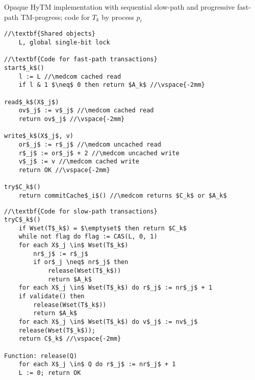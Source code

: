 \begin{algorithm*}[!ht]
\caption{Opaque HyTM implementation with sequential slow-path and progressive fast-path TM-progress; code for $T_k$ by process $p_i$}
\label{alg:inswrite2}
\vspace{-2mm}
\noindent\lstset{style=customc}
\begin{minipage}{0.49\textwidth}
\begin{lstlisting}[frame=none,firstnumber=1,mathescape=true]
//\textbf{Shared objects}
    L, global single-bit lock

//\textbf{Code for fast-path transactions}
start$_k$()
    l := L //\medcom cached read
    if l & 1 $\neq$ 0 then return $A_k$ //\vspace{-2mm}

read$_k$(X$_j$)
    ov$_j$ := v$_j$ //\medcom cached read
    return ov$_j$ //\vspace{-2mm}

write$_k$(X$_j$, v)
    or$_j$ := r$_j$ //\medcom uncached read
    r$_j$ := or$_j$ + 2 //\medcom uncached write
    v$_j$ := v //\medcom cached write
    return OK //\vspace{-2mm}

try$C_k$()
    return commitCache$_i$() //\medcom returns $C_k$ or $A_k$
\end{lstlisting}
\end{minipage}
\begin{minipage}{0.49\textwidth}
\begin{lstlisting}[frame=none,firstnumber=last,mathescape=true]
//\textbf{Code for slow-path transactions}
tryC$_k$()
    if Wset(T$_k$) = $\emptyset$ then return $C_k$
    while not flag do flag := CAS(L, 0, 1)
    for each X$_j \in$ Wset(T$_k$)
        nr$_j$ := r$_j$
        if or$_j \neq$ nr$_j$ then
            release(Wset(T$_k$))
            return $A_k$
    for each X$_j \in$ Wset(T$_k$) do r$_j$ := nr$_j$ + 1
    if validate() then
        release(Wset(T$_k$))
        return $A_k$
    for each X$_j \in$ Wset(T$_k$) do v$_j$ := nv$_j$
    release(Wset(T$_k$)); 
    return C$_k$ //\vspace{-2mm}
    
Function: release(Q)
    for each X$_j \in$ Q do r$_j$ := nr$_j$ + 1
    L := 0; return OK
\end{lstlisting}
\end{minipage}
\vspace{-2mm}
\end{algorithm*}
